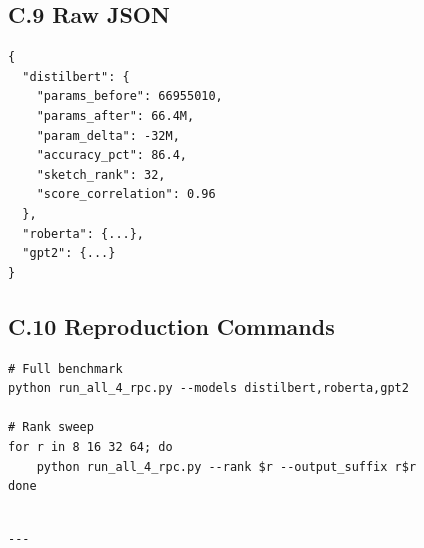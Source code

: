 \subsection{C.9 Raw JSON}

\begin{lstlisting}
{
  "distilbert": {
    "params_before": 66955010,
    "params_after": 66.4M,
    "param_delta": -32M,
    "accuracy_pct": 86.4,
    "sketch_rank": 32,
    "score_correlation": 0.96
  },
  "roberta": {...},
  "gpt2": {...}
}
\end{lstlisting}

\subsection{C.10 Reproduction Commands}

\begin{lstlisting}
# Full benchmark
python run_all_4_rpc.py --models distilbert,roberta,gpt2

# Rank sweep
for r in 8 16 32 64; do
    python run_all_4_rpc.py --rank $r --output_suffix r$r
done
\end{lstlisting}
\begin{lstlisting}

---
\end{lstlisting}